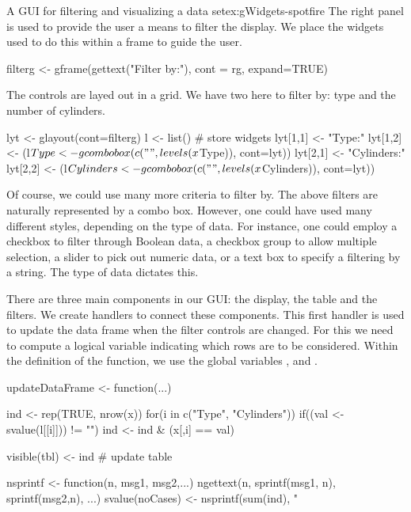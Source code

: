 \begin{example}{A GUI for filtering and visualizing a data set}{ex:gWidgets-spotfire}
The right panel is used to provide the user a means to filter the
display. We place the widgets used to do this within a frame to guide
the user.
\begin{Schunk}
\begin{Sinput}
 filterg <- gframe(gettext("Filter by:"), cont = rg, expand=TRUE)
\end{Sinput}
\end{Schunk}
The controls are layed out in a grid. We have two here to filter by:
type and the number of cylinders.
\begin{Schunk}
\begin{Sinput}
 lyt <- glayout(cont=filterg)
 l <- list() # store widgets
 lyt[1,1] <- "Type:"
 lyt[1,2] <- (l$Type <- gcombobox(c("", levels(x$Type)), 
                                  cont=lyt))
 lyt[2,1] <- "Cylinders:"
 lyt[2,2] <- (l$Cylinders <- 
              gcombobox(c("", levels(x$Cylinders)), cont=lyt))
\end{Sinput}
\end{Schunk}
%
Of course, we could use many more criteria to filter by. The above
filters are naturally represented by a combo box. However, one could
have used many different styles, depending on the type of data. For
instance, one could employ a checkbox to filter through Boolean data,
a checkbox group to allow multiple selection,
a slider to pick out numeric data, or a text box to specify a
filtering by a string. The type of data dictates this.

There are three main components in our GUI: the display, the table and
the filters. We create handlers to connect these components. This
first handler is used to
update the data frame when the filter controls are changed. For this
we need to compute a logical variable indicating which rows are to be
considered.  Within the definition of the function, we use the global
variables ,  and .
\begin{Schunk}
\begin{Sinput}
 updateDataFrame <- function(...) {
   ind <- rep(TRUE, nrow(x))
   for(i in c("Type", "Cylinders"))  {
     if((val <- svalue(l[[i]])) != "") 
       ind <- ind & (x[,i] == val)
   }
   
   visible(tbl) <- ind                   # update table
   
   nsprintf <- function(n, msg1, msg2,...)
     ngettext(n, sprintf(msg1, n), sprintf(msg2,n), ...)
   svalue(noCases) <- nsprintf(sum(ind), "%
 }
\end{Sinput}
\end{Schunk}


\end{example}
